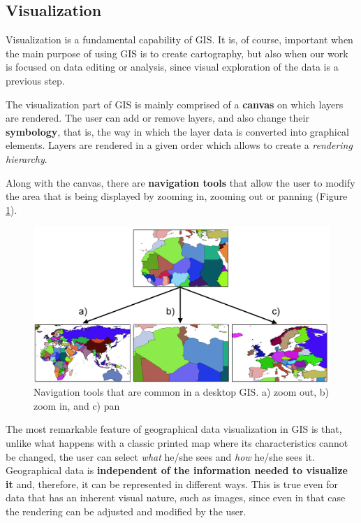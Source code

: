 \subsection{Visualization}

Visualization is a fundamental capability of GIS. It is, of course, important when the main purpose of using GIS is to create cartography, but also when our work is focused on data editing or analysis, since visual exploration of the data is a previous step.

The visualization part of GIS is mainly comprised of a \textbf{canvas} on which layers are rendered. The user can add or remove layers, and also change their \textbf{symbology}, that is, the way in which the layer data is converted into graphical elements. Layers are rendered in a given order which allows to create a \emph{rendering hierarchy}.

Along with the canvas, there are \textbf{navigation tools} that allow the user to modify the area that is being displayed by zooming in, zooming out or panning (Figure \ref{Fig:Navigation_tools}). 

\begin{figure}[!hbt]
\centering
\includegraphics[width=.99\textwidth]{Software/Navigation_tools.png}

\caption{\small Navigation tools that are common in a desktop GIS. a) zoom out, b) zoom in, and c) pan}
\label{Fig:Navigation_tools} 
\end{figure}

The most remarkable feature of geographical data visualization in GIS is that, unlike what happens with a classic printed map where its characteristics cannot be changed, the user can select \emph{what} he/she sees and \emph{how} he/she sees it. Geographical data is \textbf{independent of the information needed to visualize it} and, therefore, it can be represented in different ways. This is true even for data that has an inherent visual nature, such as images, since even in that case the rendering can be adjusted and modified by the user.

